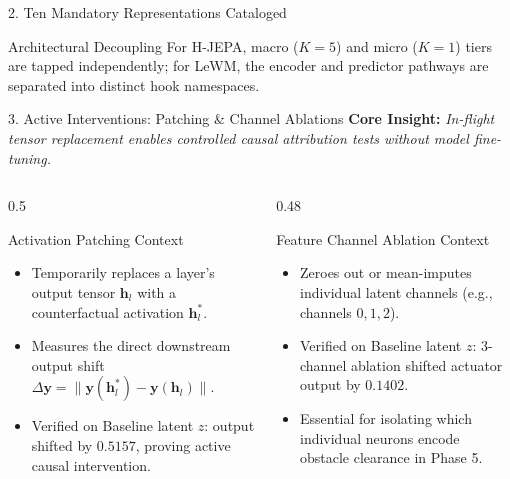 \documentclass[aspectratio=169, 10pt]{beamer}
\begin{document}
\begin{frame}{2. Ten Mandatory Representations Cataloged}
  \vspace{0.1cm}
  \begin{block}{Architectural Decoupling}
    \scriptsize
    For H-JEPA, macro ($K=5$) and micro ($K=1$) tiers are tapped independently; for LeWM, the encoder and predictor pathways are separated into distinct hook namespaces.
  \end{block}
\end{frame}

\begin{frame}{3. Active Interventions: Patching \& Channel Ablations}
  \textbf{Core Insight:} \textit{In-flight tensor replacement enables controlled causal attribution tests without model fine-tuning.}

  \vspace{0.3cm}
  \begin{columns}[T]
    \begin{column}{0.5\textwidth}
      \begin{block}{Activation Patching Context}
        \small
        \begin{itemize}
          \item Temporarily replaces a layer's output tensor $\mathbf{h}_l$ with a counterfactual activation $\mathbf{h}_l^*$.
          \item Measures the direct downstream output shift $\Delta \mathbf{y} = \|\mathbf{y}(\mathbf{h}_l^*) - \mathbf{y}(\mathbf{h}_l)\|$.
          \item Verified on Baseline latent $z$: output shifted by \textbf{$0.5157$}, proving active causal intervention.
        \end{itemize}
      \end{block}
    \end{column}

    \begin{column}{0.48\textwidth}
      \begin{alertblock}{Feature Channel Ablation Context}
        \small
        \begin{itemize}
          \item Zeroes out or mean-imputes individual latent channels (e.g., channels $0, 1, 2$).
          \item Verified on Baseline latent $z$: 3-channel ablation shifted actuator output by \textbf{$0.1402$}.
          \item Essential for isolating which individual neurons encode obstacle clearance in Phase 5.
        \end{itemize}
      \end{alertblock}
    \end{column}
  \end{columns}
\end{frame}
\end{document}
